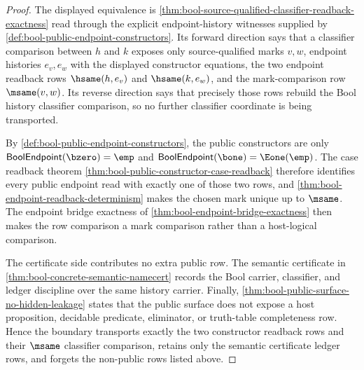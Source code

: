 \begin{proof}
The displayed equivalence is \autoref{thm:bool-source-qualified-classifier-readback-exactness} read through the explicit endpoint-history witnesses supplied by \autoref{def:bool-public-endpoint-constructors}. Its forward direction says that a classifier comparison between $h$ and $k$ exposes only source-qualified marks $v,w$, endpoint histories $e_v,e_w$ with the displayed constructor equations, the two endpoint readback rows
$\hsame(h,e_v)$ and
$\hsame(k,e_w)$, and the mark-comparison row $\msame(v,w)$. Its reverse direction says that precisely those rows rebuild the Bool history classifier comparison, so no further classifier coordinate is being transported.

By \autoref{def:bool-public-endpoint-constructors}, the public constructors are only
$\mathsf{BoolEndpoint}(\bzero)=\emp$ and
$\mathsf{BoolEndpoint}(\bone)=\Eone(\emp)$. The case readback theorem \autoref{thm:bool-public-constructor-case-readback} therefore identifies every public endpoint read with exactly one of those two rows, and \autoref{thm:bool-endpoint-readback-determinism} makes the chosen mark unique up to $\msame$. The endpoint bridge exactness of \autoref{thm:bool-endpoint-bridge-exactness} then makes the row comparison a mark comparison rather than a host-logical comparison.

The certificate side contributes no extra public row. The semantic certificate in \autoref{thm:bool-concrete-semantic-namecert} records the Bool carrier, classifier, and ledger discipline over the same history carrier. Finally, \autoref{thm:bool-public-surface-no-hidden-leakage} states that the public surface does not expose a host proposition, decidable predicate, eliminator, or truth-table completeness row. Hence the boundary transports exactly the two constructor readback rows and their $\msame$ classifier comparison, retains only the semantic certificate ledger rows, and forgets the non-public rows listed above.
\end{proof}

